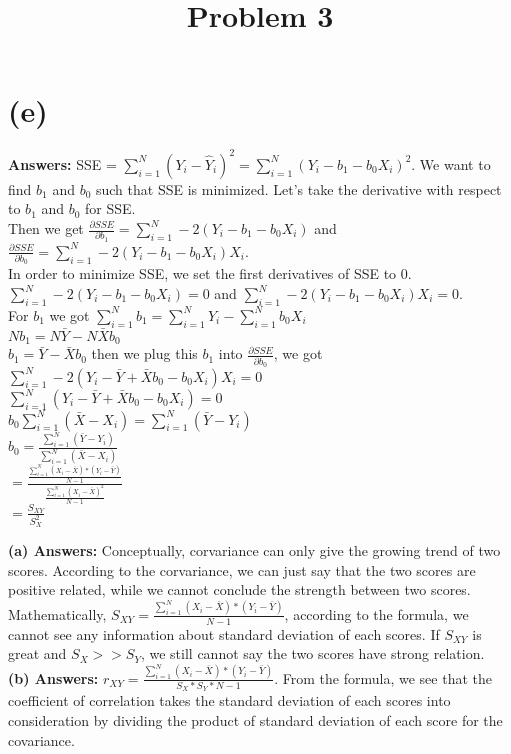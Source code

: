 \documentclass{article}
\begin{document}
\section{(e)}\textbf{Answers:} SSE = $\sum^N_{i=1} (Y_i - \hat{Y}_i)^2 = \sum^N_{i=1} (Y_i - b_1 - b_0X_i)^2$. We want to find $b_1$ and $b_0$ such that SSE is minimized. Let's take the derivative with respect to $b_1$ and $b_0$ for SSE. \\
Then we get $\frac{\partial SSE}{\partial b_1} = \sum^N_{i=1} -2(Y_i - b_1 - b_0X_i)$ and $\frac{\partial SSE}{\partial b_0} = \sum^N_{i=1} -2(Y_i - b_1 - b_0X_i)X_i$. \\
In order to minimize SSE, we set the first derivatives of SSE to 0. $\sum^N_{i=1} -2(Y_i - b_1 - b_0X_i) = 0$ and $\sum^N_{i=1} -2(Y_i - b_1 - b_0X_i)X_i = 0$. \\
For $b_1$ we got $\sum^N_{i=1} b_1 = \sum^N_{i=1} Y_i - \sum^N_{i=1} b_0X_i $\\
$Nb_1 = N\bar{Y} - N\bar{X}b_0$\\
$b_1 = \bar{Y} - \bar{X}b_0$
then we plug this $b_1$ into $\frac{\partial SSE}{\partial b_0}$, we got $\sum^N_{i=1} -2(Y_i - \bar{Y} + \bar{X}b_0 - b_0X_i)X_i = 0$\\
$\sum^N_{i=1} (Y_i - \bar{Y} + \bar{X}b_0 - b_0X_i) = 0$\\
$b_0 \sum^N_{i=1} (\bar{X} - X_i) = \sum^N_{i=1} (\bar{Y} - Y_i)$\\
$b_0 = \frac{\sum^N_{i=1} (\bar{Y} - Y_i)}{\sum^N_{i=1} (\bar{X} - X_i)}$\\
$= \frac{\frac{\sum_{i=1}^{N}\left(X_{i}-\bar{X}\right) *\left(Y_{i}-\bar{Y}\right)}{N-1}}{\frac{\sum_{i=1}^{N}\left(X_{i}-\bar{X}\right)^{2}}{N-1}}$\\
$ = \frac{S_{X Y}}{S_{X}^{2}}$\\

\title{Problem 3}

\textbf{(a) Answers:} Conceptually, corvariance can only give the growing trend of two scores. According to the corvariance, we can just say that the two scores are positive related, while we cannot conclude the strength between two scores. Mathematically, $S_{X Y}=\frac{\sum_{i=1}^{N}\left(X_{i}-\bar{X}\right) *\left(Y_{i}-\bar{Y}\right)}{N-1}$, according to the formula, we cannot see any information about standard deviation of each scores. If $S_{XY}$ is great and $S_X >> S_Y$, we still cannot say the two scores have strong relation. \\
\textbf{(b) Answers:} $r_{X Y}=\frac{\sum_{i=1}^{N}\left(X_{i}-\bar{X}\right) *\left(Y_{i}-\bar{Y}\right)}{S_{X} * S_{Y} * N-1}$. From the formula, we see that the coefficient of correlation takes the standard deviation of each scores into consideration by dividing the product of standard deviation of each score for the covariance.  
\end{document}
